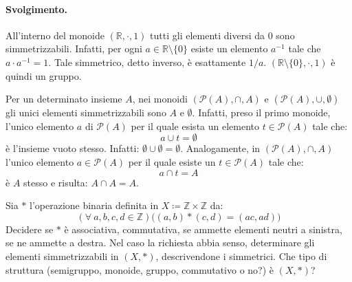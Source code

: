 \paragraph{Svolgimento.} 	All'interno del monoide $(\mathbb{R}, \cdot, 1)$ tutti gli elementi diversi da 0 sono simmetrizzabili. Infatti, per ogni $a\in \mathbb{R}\setminus \{0\}$ esiste un elemento $a^{-1}$ tale che $a \cdot a^{-1} = 1$. Tale simmetrico, detto inverso, è esattamente $1/a$. $(\mathbb{R}\setminus \{0\}, \cdot, 1)$ è quindi un gruppo.
\bigskip

Per un determinato insieme $A$, nei monoidi $(\mathcal{P}(A), \cap, A)$ e $(\mathcal{P}(A), \cup, \emptyset)$ gli unici elementi simmetrizzabili sono $A$ e $\emptyset$. Infatti, preso il primo monoide, l'unico elemento $a$ di $\mathcal{P}(A)$ per il quale esista un elemento $t \in \mathcal{P}(A)$ tale che:
\begin{displaymath}
	a \cup t = \emptyset
\end{displaymath}
è l'insieme vuoto stesso. Infatti: $\emptyset \cup \emptyset = \emptyset$. Analogamente, in $(\mathcal{P}(A), \cap, A)$ l'unico elemento $a \in \mathcal{P}(A)$ per il quale esiste un $t \in \mathcal{P}(A)$ tale che:
\begin{displaymath}
	a \cap t = A
\end{displaymath}
è $A$ stesso e risulta: $A \cap A = A$. \hfill \blacksquare
\begin{exsbox}
	Sia $\ast$ l'operazione binaria definita in $X \coloneqq \mathbb{Z} \times \mathbb{Z}$ da:
	\begin{displaymath}
		(\forall \ a,b,c,d \in \mathbb{Z})\bigl((a,b) \ast (c,d) =(ac,ad)\bigr)
	\end{displaymath}
	Decidere se $\ast$ è associativa, commutativa, se ammette elementi neutri a sinistra, se ne ammette a destra. Nel caso la richiesta abbia senso, determinare gli elementi simmetrizzabili in $(X, \ast)$, descrivendone i simmetrici. Che tipo di struttura (semigruppo, monoide, gruppo, commutativo o no?) è $(X, \ast)$?
\end{exsbox}
